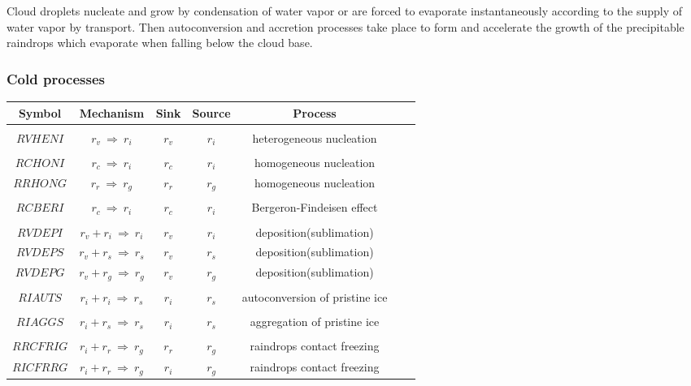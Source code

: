 Cloud droplets nucleate and grow by condensation of water vapor or are forced to
evaporate instantaneously according to the supply of water vapor by transport.
Then autoconversion and accretion processes take place to form and accelerate
the growth of the precipitable raindrops which evaporate when falling below the
cloud base.

%
\subsubsection{Cold processes}
%
\vskip 1cm

%
\begin{center}\label{table4}
\begin{tabular}{|c|c|c|c|c|c|c|}
\hline
Symbol & Mechanism & Sink & Source & Process \\
\hline \hline
 & & & & \\
$RVHENI$ & $r_v\ \Longrightarrow \ r_i$ & $r_v$ & $r_i$ & heterogeneous nucleation\\
 & & & & \\
$RCHONI$ & $r_c\ \Longrightarrow \ r_i$ & $r_c$ & $r_i$ & homogeneous nucleation\\
$RRHONG$ & $r_r\ \Longrightarrow \ r_g$ & $r_r$ & $r_g$ & homogeneous nucleation\\
 & & & & \\
$RCBERI$ & $r_c\ \Longrightarrow \ r_i$ & $r_c$ & $r_i$ & Bergeron-Findeisen effect \\
 & & & & \\
$RVDEPI$ & $r_v+r_i\ \Longrightarrow \ r_i$ & $r_v$ & $r_i$ & deposition(sublimation) \\
$RVDEPS$ & $r_v+r_s\ \Longrightarrow \ r_s$ & $r_v$ & $r_s$ & deposition(sublimation) \\
$RVDEPG$ & $r_v+r_g\ \Longrightarrow \ r_g$ & $r_v$ & $r_g$ & deposition(sublimation) \\
 & & & & \\
$RIAUTS$ & $r_i+r_i\ \Longrightarrow \ r_s$ & $r_i$ & $r_s$ & autoconversion of pristine ice \\
 & & & & \\
$RIAGGS$ & $r_i+r_s\ \Longrightarrow \ r_s$ & $r_i$ & $r_s$ & aggregation of pristine ice \\
 & & & & \\
$RRCFRIG$ & $r_i+r_r\ \Longrightarrow \ r_g$ & $r_r$ & $r_g$ & raindrops contact freezing \\
$RICFRRG$ & $r_i+r_r\ \Longrightarrow \ r_g$ & $r_i$ & $r_g$ & raindrops contact freezing \\

\end{tabular}
\end{center}
